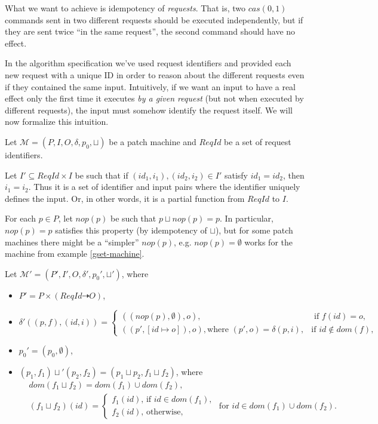 \documentclass[12pt,a4paper,en]{pracamgr}
\newcommand{\ti}[1]{\textit{#1}}
\newcommand{\mc}[1]{\mathcal{#1}}
\begin{document}
What we want to achieve is idempotency of \ti{requests}. That is, two $cas(0, 1)$ commands sent in two different requests should be executed independently, but if they are sent twice ``in the same request'', the second command should have no effect.

In the algorithm specification we've used request identifiers and provided each new request with a unique ID in order to reason about the different requests even if they contained the same input. Intuitively, if we want an input to have a real effect only the first time it executes \ti{by a given request} (but not when executed by different requests), the input must somehow identify the request itself. We will now formalize this intuition.

Let $\mc M = (P, I, O, \delta, p_0, \sqcup)$ be a patch machine and $ReqId$ be a set of request identifiers.

Let $I' \subseteq ReqId \times I$ be such that if $(id_1, i_1), (id_2, i_2) \in I'$ satisfy $id_1 = id_2$, then $i_1 = i_2$. Thus it is a set of identifier and input pairs where the identifier uniquely defines the input. Or, in other words, it is a partial function from $ReqId$ to $I$.

For each $p \in P$, let $nop(p)$ be such that $p \sqcup nop(p) = p$. In particular, $nop(p) = p$ satisfies this property (by idempotency of $\sqcup$), but for some patch machines there might be a ``simpler'' $nop(p)$, e.g. $nop(p) = \emptyset$ works for the machine from example \ref{gset-machine}.

Let $\mc M' = (P', I', O, \delta', p_0', \sqcup')$, where
\begin{itemize}
    \item $P' = P \times (ReqId \dashrightarrow O)$,
    \item $\delta'((p, f), (id, i)) = \begin{cases} ((nop(p), \emptyset), o), &\text{ if } f(id) = o,\\ ((p', [id \mapsto o]), o),\text{where } (p', o) = \delta(p, i), &\text{if } id \notin dom(f),\end{cases}$
    \item $p_0' = (p_0, \emptyset)$,
    \item $(p_1, f_1) \sqcup' (p_2, f_2) = (p_1 \sqcup p_2, f_1 \sqcup f_2)$, where
        \begin{align*}
            & dom(f_1 \sqcup f_2) = dom(f_1) \cup dom(f_2),\\
            & (f_1 \sqcup f_2)(id) = \begin{cases} f_1(id)\text{, if } id \in dom(f_1),\\ f_2(id)\text{, otherwise,} \end{cases}\text{ for }id \in dom(f_1) \cup dom(f_2).
        \end{align*}
\end{itemize}
\end{document}
